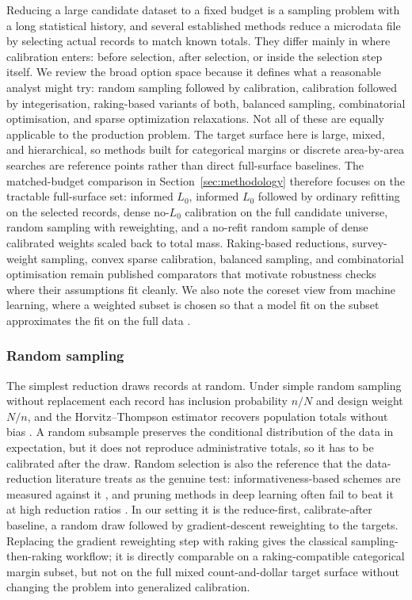 Reducing a large candidate dataset to a fixed budget is a sampling problem with a long statistical
history, and several established methods reduce a microdata file by selecting actual records to match
known totals. They differ mainly in where calibration enters: before selection, after selection, or
inside the selection step itself. We review the broad option space because it defines what a reasonable
analyst might try: random sampling followed by calibration, calibration followed by integerisation,
raking-based variants of both, balanced sampling, combinatorial optimisation, and sparse optimization
relaxations. Not all of these are equally applicable to the production problem. The target surface here
is large, mixed, and hierarchical, so methods built for categorical margins or discrete area-by-area
searches are reference points rather than direct full-surface baselines. The matched-budget comparison
in Section~\ref{sec:methodology} therefore focuses on the tractable full-surface set: informed $L_0$,
informed $L_0$ followed by ordinary refitting on the selected records, dense no-$L_0$ calibration on the
full candidate universe, random sampling with reweighting, and a no-refit random sample of dense
calibrated weights scaled back to total mass. Raking-based reductions, survey-weight sampling, convex
sparse calibration, balanced sampling, and combinatorial optimisation remain published comparators that
motivate robustness checks where their assumptions fit cleanly. We also note the coreset view from
machine learning, where a weighted subset is chosen so that a model fit on the subset approximates the
fit on the full data \citep{feldman2020coresets, bachem2017coresets}.

\subsubsection{Random sampling}

The simplest reduction draws records at random. Under simple random sampling without replacement each
record has inclusion probability $n/N$ and design weight $N/n$, and the Horvitz--Thompson estimator
recovers population totals without bias \citep{horvitz1952, cochran1977, sarndal1992}. A random
subsample preserves the conditional distribution of the data in expectation, but it does not
reproduce administrative totals, so it has to be calibrated after the draw. Random selection is also
the reference that the data-reduction literature treats as the genuine test: informativeness-based
schemes are measured against it \citep{ma2015leveraging}, and pruning methods in deep learning often
fail to beat it at high reduction ratios \citep{guo2022deepcore}. In our setting it is the
reduce-first, calibrate-after baseline, a random draw followed by gradient-descent reweighting to the
targets. Replacing the gradient reweighting step with raking gives the classical sampling-then-raking
workflow; it is directly comparable on a raking-compatible categorical margin subset, but not on the
full mixed count-and-dollar target surface without changing the problem into generalized calibration.

